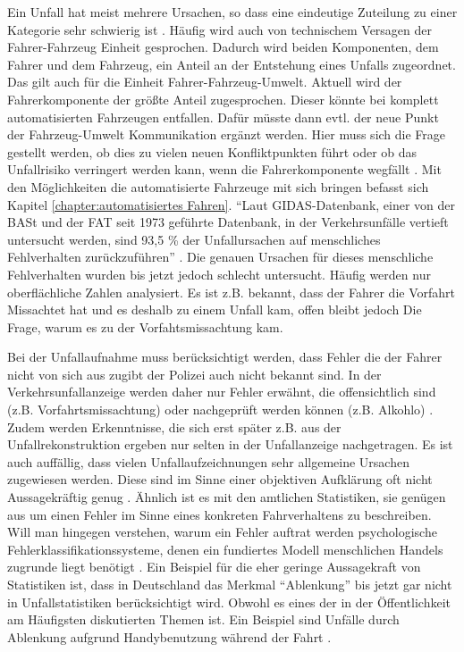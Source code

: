 Ein Unfall hat meist mehrere Ursachen, so dass eine eindeutige Zuteilung zu einer Kategorie sehr schwierig ist \parencite[S. 78]{Grundl.2005}. Häufig wird auch von technischem Versagen der Fahrer-Fahrzeug Einheit gesprochen. Dadurch wird beiden Komponenten, dem Fahrer und dem Fahrzeug, ein Anteil an der Entstehung eines Unfalls zugeordnet. Das gilt auch für die Einheit Fahrer-Fahrzeug-Umwelt. Aktuell wird der Fahrerkomponente der größte Anteil zugesprochen. Dieser könnte bei komplett automatisierten Fahrzeugen entfallen. Dafür müsste dann evtl. der neue Punkt der Fahrzeug-Umwelt Kommunikation ergänzt werden. Hier muss sich die Frage gestellt werden, ob dies zu vielen neuen Konfliktpunkten führt oder ob das Unfallrisiko verringert werden kann, wenn die Fahrerkomponente wegfällt \parencite[S. 70]{Bock.1989}. Mit den Möglichkeiten die automatisierte Fahrzeuge mit sich bringen befasst sich Kapitel \ref{chapter:automatisiertes Fahren}. \enquote{Laut \ac{GIDAS}-Datenbank, einer von der \ac{BASt} und der \ac{FAT} seit 1973 geführte Datenbank, in der Verkehrsunfälle vertieft untersucht werden, sind 93,5 \% der Unfallursachen auf menschliches Fehlverhalten zurückzuführen} \parencite[S. 10]{Grundl.2005}. Die genauen Ursachen für dieses menschliche Fehlverhalten wurden bis jetzt jedoch schlecht untersucht. Häufig werden nur oberflächliche Zahlen analysiert. Es ist z.B. bekannt, dass der Fahrer die Vorfahrt Missachtet hat und es deshalb zu einem Unfall kam, offen bleibt jedoch Die Frage, warum es zu der Vorfahtsmissachtung kam.

Bei der Unfallaufnahme muss berücksichtigt werden, dass Fehler die der Fahrer nicht von sich aus zugibt der Polizei auch nicht bekannt sind. In der Verkehrsunfallanzeige werden daher nur Fehler erwähnt, die offensichtlich sind (z.B. Vorfahrtsmissachtung) oder nachgeprüft werden können (z.B. Alkohlo) \parencite[S. 27]{Grundl.2005}. Zudem werden Erkenntnisse, die sich erst später z.B. aus der Unfallrekonstruktion ergeben nur selten in der Unfallanzeige nachgetragen. Es ist auch auffällig, dass vielen Unfallaufzeichnungen sehr allgemeine Ursachen zugewiesen werden. Diese sind im Sinne einer objektiven Aufklärung oft nicht Aussagekräftig genug \parencite[S. 11]{DEKRA.2017}. Ähnlich ist es mit den amtlichen Statistiken, sie genügen aus um einen Fehler im Sinne eines konkreten Fahrverhaltens zu beschreiben. Will man hingegen verstehen, warum ein Fehler auftrat werden psychologische Fehlerklassifikationssysteme, denen ein fundiertes Modell menschlichen Handels zugrunde liegt benötigt \parencite[S. 79]{Grundl.2005}. Ein Beispiel für die eher geringe Aussagekraft von Statistiken ist, dass in Deutschland das Merkmal \enquote{Ablenkung} bis jetzt gar nicht in Unfallstatistiken berücksichtigt wird. Obwohl es eines der in der Öffentlichkeit am Häufigsten diskutierten Themen ist. Ein Beispiel sind Unfälle durch Ablenkung aufgrund Handybenutzung während der Fahrt \parencite[S. 42]{DEKRA.2017}.

